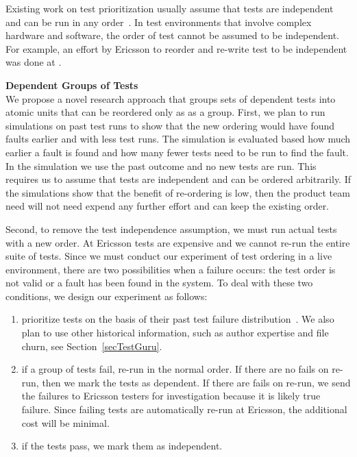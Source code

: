 Existing work on test prioritization usually assume that tests are independent and can be run in any order~\cite{GooglePapper,Hemmati}. In test environments that involve complex hardware and software, the order of test cannot be assumed to be independent. For example, an effort by Ericsson  to reorder and re-write test to be independent was done at . 

\textbf{Dependent Groups of Tests}\\
We propose a novel research approach that groups sets of dependent tests into atomic units that can be reordered only as as a group. 
%
First, we plan to run simulations on past test runs to show that the new ordering would have found faults earlier and with less test runs. The simulation is evaluated based how much earlier a fault is found and how many fewer tests need to be run to find the fault. 
%
In the simulation we use the past outcome and no new tests are run. This requires us to assume that tests are independent and can be ordered arbitrarily. If the simulations show that the benefit of re-ordering is low, then the product team need will not need expend any further effort and can keep the existing order.

Second, to remove the test independence assumption, we must run actual tests with a new order. At Ericsson tests are expensive and we cannot re-run the entire suite of tests. 
%
Since we must conduct our experiment of test ordering in a live environment, there are two possibilities when a failure occurs: the test order is not valid or a fault has been found in the system. To deal with these two conditions, we design our experiment as follows:

\begin{enumerate}

\item prioritize tests on the basis of their past test failure distribution~\cite{Kim2002ICSE,Hemmati}. We also plan to use other historical information, such as author expertise and file churn, see Section~\ref{secTestGuru}.

\item if a group of tests fail, re-run in the normal order. If there are no fails on re-run, then we mark the tests as dependent. If there are fails on re-run, we send the failures to Ericsson testers for investigation because it is likely true failure. Since failing tests are automatically re-run at Ericsson, the additional cost will be minimal.
 
\item if the tests pass, we mark them as independent.

\end{enumerate}

